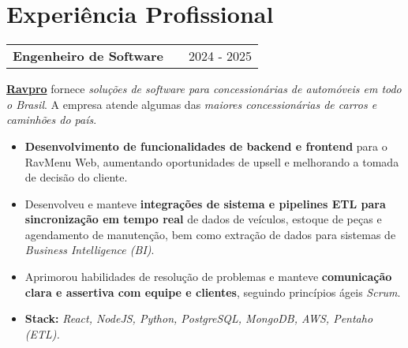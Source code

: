 \documentclass[a4paper,12pt]{article}
\makeatletter
\newenvironment{joblong}[2]
{
    \begin{tabularx}{\linewidth}{@{}l X r@{}}
        \textbf{#1} & \hfill & #2 \\[3.75pt]
    \end{tabularx}
    \begin{minipage}[t]{\linewidth}
    }
    {
    \end{minipage}
}
\newenvironment{bullets}
{
    \begin{itemize}[nosep,after=\strut, leftmargin=1em, itemsep=3pt,label=--]
    }
    {
    \end{itemize}
}
\makeatother
\begin{document}


    \section{Experiência Profissional}


    \begin{joblong}{Engenheiro de Software}{2024 - 2025}
        \href{https://ravpro.com.br}{\textbf{Ravpro}} fornece \textit{soluções de software para concessionárias de automóveis em todo o Brasil}. A empresa atende algumas das \textit{maiores concessionárias de carros e caminhões do país}.
        \begin{bullets}
            \item \textbf{Desenvolvimento de funcionalidades de backend e frontend} para o RavMenu Web, aumentando oportunidades de upsell e melhorando a tomada de decisão do cliente.
            \item Desenvolveu e manteve \textbf{integrações de sistema e pipelines ETL para sincronização em tempo real} de dados de veículos, estoque de peças e agendamento de manutenção, bem como extração de dados para sistemas de \textit{Business Intelligence (BI)}.
            \item Aprimorou habilidades de resolução de problemas e manteve \textbf{comunicação clara e assertiva com equipe e clientes}, seguindo princípios ágeis \textit{Scrum}.
            \item \textbf{Stack:} \textit{React, NodeJS, Python, PostgreSQL, MongoDB, AWS, Pentaho (ETL).}
        \end{bullets}
    \end{joblong}
\end{document}
